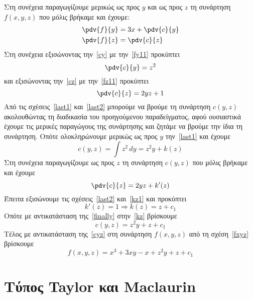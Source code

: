 \begin{solution}
\begin{description}
\begin{equation}
      \end{equation}
      Στη συνέχεια παραγωγίζουμε μερικώς ως προς $y$ και ως προς $z$  
      τη συνάρτηση $f(x,y,z)$ που μόλις βρήκαμε και έχουμε:
      \begin{align}
        \pdv{f}{y} &= 3x + \pdv{c}{y} \label{cy} \\
        \pdv{f}{z} &= \pdv{c}{z} \label{cz}
      \end{align}
      Στη συνέχεια εξισώνοντας την~\eqref{cy} με την~\eqref{fy11} προκύπτει 
      \begin{equation}
        \pdv{c}{y} = z^{2} \label{last1}
      \end{equation}
      και εξισώνοντας την~\eqref{cz} με την~\eqref{fz11} προκύπτει
      \begin{equation}
        \pdv{c}{z} = 2yz+1 \label{last2}
      \end{equation}
      Από τις σχέσεις~\eqref{last1} και~\eqref{last2} μπορούμε να βρούμε τη συνάρτηση 
      $ c(y,z) $ ακολουθώντας τη διαδικασία του προηγούμενου παραδείγματος, αφού 
      ουσιαστικά έχουμε τις μερικές παραγώγους της συνάρτησης και ζητάμε 
      να βρούμε την ίδια τη συνάρτηση. Οπότε ολοκληρώνουμε μερικώς ως προς 
      $y$ την~\eqref{last1} και έχουμε
      \begin{equation}
        c(y,z) = \int z^{2} \,{dy} = z^{2}y + k(z) \label{kz} 
      \end{equation} 
      Στη συνέχεια παραγωγίζουμε ως προς $z$ τη συνάρτηση $ c(y,z) $ που μόλις βρήκαμε 
      και έχουμε
      \begin{equation}
        \pdv{c}{z} = 2yz + k'(z) \label{kz1}
      \end{equation} 
      Έπειτα εξισώνουμε τις σχέσεις~\eqref{last2} και~\eqref{kz1} και προκύπτει 
      \[
        k'(z) = 1 \Rightarrow k(z) = z + c_{1} \label{finally}
      \] 
      Οπότε με αντικατάσταση της~\eqref{finally} στην~\eqref{kz} βρίσκουμε 
      \begin{equation}
        c(y,z) = z^{2}y+z + c_{1} \label{cyz}
      \end{equation}
      Τέλος με αντικατάσταση της~\eqref{cyz} στη συνάρτηση $ f(x,y,z) $ από τη 
      σχέση~\eqref{fxyz} βρίσκουμε
      \[
        f(x,y,z) = x^{3}+3xy-x+z^{2}y+z+ c_{1} 
      \] 
  \end{description}
\end{solution}


\section{Τύπος Taylor και Maclaurin}


